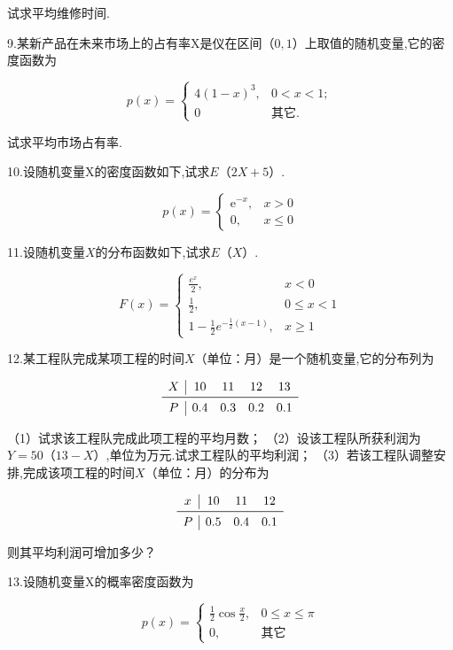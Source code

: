 试求平均维修时间.

9.某新产品在未来市场上的占有率X是仪在区间$ （0,1） $上取值的随机变量,它的密度函数为

\[
p(x)=\left\{\begin{array}{ll}
{4(1-x)^{3},} & {0<x<1;} \\ {0} & {\text{其它.}}
\end{array}\right.
\]

试求平均市场占有率.

10.设随机变量X的密度函数如下,试求$ E（2X+5） $.

\[
p(x)=\left\{\begin{array}{ll}
{\mathrm{e}^{-x},} & {x>0} \\ 
{0,} & {x \leqslant 0}
\end{array}\right.
\]

11.设随机变量$ X $的分布函数如下,试求$ E（X） $.

\[
F(x)=\left\{\begin{array}{ll}
{\frac{e^{x}}{2},} & {x<0} \\ {\frac{1}{2},} & {0 \leqslant x<1} \\
{1-\frac{1}{2} e^{-\frac{1}{2}(x-1)},} & {x \geqslant 1}
\end{array}\right.
\]

12.某工程队完成某项工程的时间$ X $（单位：月）是一个随机变量,它的分布列为

\[
\begin{array}{c|cccc}
X     & 10    & 11    & 12    & 13 \\\midrule
P     & 0.4   & 0.3   & 0.2   & 0.1 \\
\end{array}
\]

（1）试求该工程队完成此项工程的平均月数；
（2）设该工程队所获利润为$ Y=50（13-X） $,单位为万元.试求工程队的平均利润；
（3）若该工程队调整安排,完成该项工程的时间$ X $（单位：月）的分布为

\[
\begin{array}{c|ccc}
{x} & {10} & {11} & {12} \\ \midrule
P & {0.5} & {0.4} & {0.1} \\
\end{array}
\]

则其平均利润可增加多少？

13.设随机变量X的概率密度函数为

\[
p(x)=\left\{\begin{array}{ll}
{\frac{1}{2} \cos \frac{x}{2},} & {0 \leqslant x \leqslant \pi} \\
{0,} & {\text{其它}}
\end{array}\right.
\]

